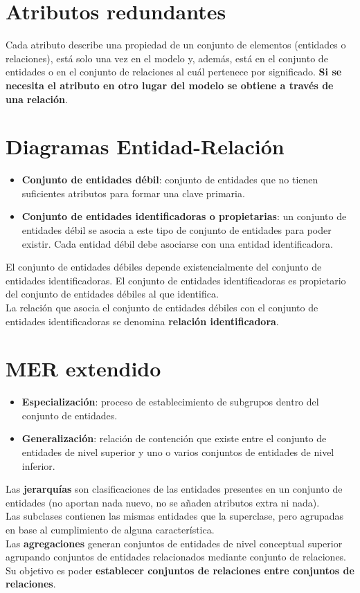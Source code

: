 \documentclass{article}
\begin{document}
\section{Atributos redundantes}
Cada atributo describe una propiedad de un conjunto de elementos (entidades o relaciones), está solo una vez en el modelo y, además, está en el conjunto de entidades o en el conjunto de relaciones al cuál pertenece por significado. \textbf{Si se necesita el atributo en otro lugar del modelo se obtiene a través de una relación}.

\newpage

\section{Diagramas Entidad-Relación}
\begin{itemize}
    \item \textbf{Conjunto de entidades débil}: conjunto de entidades que no tienen suficientes atributos para formar una clave primaria.

    \item \textbf{Conjunto de entidades identificadoras o propietarias}: un conjunto de entidades débil se asocia a este tipo de conjunto de entidades para poder existir. Cada entidad débil debe asociarse con una entidad identificadora.
\end{itemize}

El conjunto de entidades débiles depende existencialmente del conjunto de entidades identificadoras. El conjunto de entidades identificadoras es propietario del conjunto de entidades débiles al que identifica. \\
La relación que asocia el conjunto de entidades débiles con el conjunto de entidades identificadoras se denomina \textbf{relación identificadora}.

\section{MER extendido}
\begin{itemize}
    \item \textbf{Especialización}: proceso de establecimiento de subgrupos dentro del conjunto de entidades.
    \item \textbf{Generalización}: relación de contención que existe entre el conjunto de entidades de nivel superior y uno o varios conjuntos de entidades de nivel inferior.
\end{itemize}

Las \textbf{jerarquías} son clasificaciones de las entidades presentes en un conjunto de entidades (no aportan nada nuevo, no se añaden atributos extra ni nada). \\
Las subclases contienen las mismas entidades que la superclase, pero agrupadas en base al cumplimiento de alguna característica. \\
Las \textbf{agregaciones} generan conjuntos de entidades de nivel conceptual superior agrupando conjuntos de entidades relacionados mediante conjunto de relaciones. Su objetivo es poder \textbf{establecer conjuntos de relaciones entre conjuntos de relaciones}.
\end{document}

